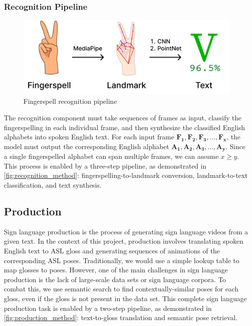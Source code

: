 \documentclass[../paper.tex]{subfiles}
\begin{document}
\subsubsection*{Recognition Pipeline}

\begin{figure}[!htbp]
  \centerline{\includegraphics[width=\linewidth]{../figures/recognition-method.png}}
  \caption{Fingerspell recognition pipeline}\label{fig:recognition_method}
\end{figure}

The recognition component must take sequences of frames as input, classify the fingerspelling in each individual frame, and then synthesize the classified English alphabets into spoken English text. For each input frame $\mathbf{F_1, F_2, F_3,...,F_x}$, the model must output the corresponding English alphabet $\mathbf{A_1, A_2, A_3,...,A_y}$. Since a single fingerspelled alphabet can span multiple frames, we can assume $x \geq y$. This process is enabled by a three-step pipeline, as demonstrated in \autoref{fig:recognition_method}: fingerspelling-to-landmark conversion, landmark-to-text classification, and text synthesis.

\subsection{Production}

Sign language production is the process of generating sign language videos from a given text. In the context of this project, production involves translating spoken English text to ASL gloss and generating sequences of animations of the corresponding ASL poses. Traditionally, we would use a simple lookup table to map glosses to poses. However, one of the main challenges in sign language production is the lack of large-scale data sets or sign language corpora. To combat this, we use semantic search to find contextually-similar poses for each gloss, even if the gloss is not present in the data set. This complete sign language production task is enabled by a two-step pipeline, as demonstrated in \autoref{fig:production_method}: text-to-gloss translation and semantic pose retrieval.
\end{document}
